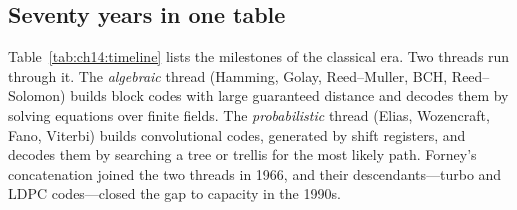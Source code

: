 \subsection{Seventy years in one table}

Table~\ref{tab:ch14:timeline} lists the milestones of the classical era. Two threads run
through it. The \emph{algebraic} thread (Hamming, Golay, Reed--Muller, BCH, Reed--Solomon)
builds block codes with large guaranteed distance and decodes them by solving equations over
finite fields. The \emph{probabilistic} thread (Elias, Wozencraft, Fano, Viterbi) builds
convolutional codes, generated by shift registers, and decodes them by searching a tree or
trellis for the most likely path. Forney's concatenation joined the two threads in 1966, and
their descendants---turbo and LDPC codes---closed the gap to capacity in the 1990s.

